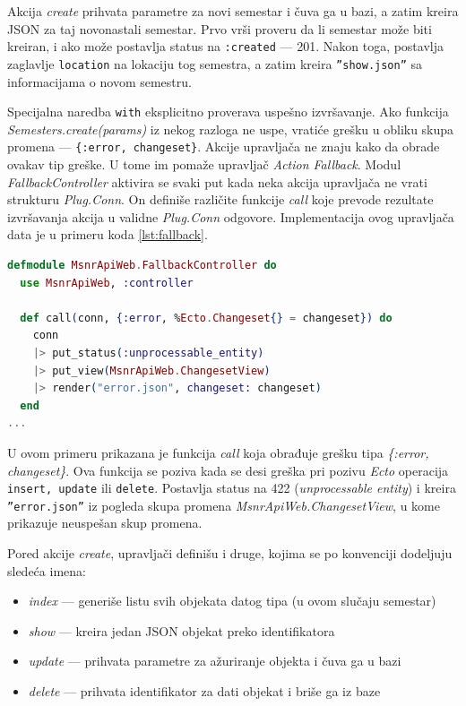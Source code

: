 \documentclass[12pt,oneside]{memoir}
\begin{document}
\par Akcija \emph{create} prihvata parametre za novi semestar i čuva ga u bazi, a zatim kreira JSON za taj novonastali semestar. Prvo vrši proveru da li semestar može biti kreiran, i ako može postavlja status na \texttt{:created} --- 201. Nakon toga, postavlja zaglavlje \texttt{location} na lokaciju tog semestra, a zatim kreira \texttt{''show.json''} sa informacijama o novom semestru.
\par Specijalna naredba \texttt{with} eksplicitno proverava uspešno izvršavanje. Ako funkcija \emph{Semesters.create(params)} iz nekog razloga ne uspe, vratiće grešku u obliku skupa promena --- \texttt{\{:error, changeset\}}.  Akcije upravljača ne znaju kako da obrade ovakav tip greške. U tome im pomaže upravljač \emph{Action Fallback}. Modul \emph{FallbackController} aktivira se svaki put kada neka akcija upravljača ne vrati strukturu \emph{Plug.Conn}. On definiše različite funkcije \emph{call} koje prevode rezultate izvršavanja akcija u validne \emph{Plug.Conn} odgovore. Implementacija ovog upravljača data je u primeru koda \ref{lst:fallback}. \\

\begin{minipage}{\linewidth}
\begin{lstlisting}[language=elixir, basicstyle=\small, caption={Struktura upravljača \emph{FallbackController}},captionpos=b, label={lst:fallback}]
defmodule MsnrApiWeb.FallbackController do
  use MsnrApiWeb, :controller

  def call(conn, {:error, %Ecto.Changeset{} = changeset}) do
    conn
    |> put_status(:unprocessable_entity)
    |> put_view(MsnrApiWeb.ChangesetView)
    |> render("error.json", changeset: changeset)
  end
...
\end{lstlisting}
\end{minipage}


\par U ovom primeru prikazana je funkcija \emph{call} koja obrađuje grešku tipa \emph{\{:error, changeset\}}. Ova funkcija se poziva kada se desi greška pri pozivu \emph{Ecto}     operacija \texttt{insert, update} ili \texttt{delete}. Postavlja status na 422 (\emph{unprocessable entity}) i kreira \texttt{''error.json''} iz pogleda skupa promena \emph{MsnrApiWeb.ChangesetView}, u kome prikazuje neuspešan skup promena.


\par Pored akcije \emph{create}, upravljači definišu i druge, kojima se po konvenciji dodeljuju sledeća imena: 
\begin{itemize}
\item \emph{index} --- generiše listu svih objekata datog tipa (u ovom slučaju semestar)
\item \emph{show} --- kreira jedan JSON objekat preko identifikatora
\item \emph{update} --- prihvata parametre za ažuriranje objekta i čuva ga u bazi
\item \emph{delete} --- prihvata identifikator za dati objekat i briše ga iz baze
\end{itemize}
\end{document}
